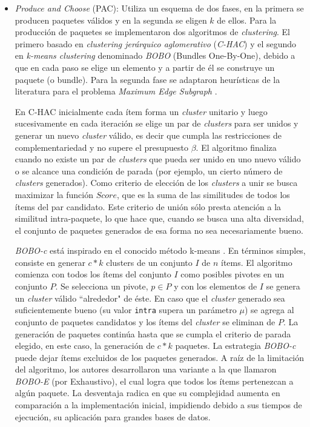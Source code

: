 \begin{itemize}

\item {\em Produce and Choose} (PAC): Utiliza un esquema de dos fases, en la primera se producen paquetes válidos y en la segunda se eligen $k$ de ellos. Para la producción de paquetes se implementaron dos algoritmos de {\em clustering}. El primero basado en {\em clustering jerárquico aglomerativo} (\textit{C-HAC}) y el segundo en {\em k-means clustering} denominado \textit{BOBO} (Bundles One-By-One), debido a que en cada paso se elige un elemento y a partir de él se construye un paquete (o bundle). Para la segunda fase se adaptaron heurísticas de la literatura para el problema {\em Maximum Edge Subgraph} \cite{finding_maximum_density_subgraph}.

En C-HAC inicialmente cada ítem forma un {\em cluster} unitario y luego sucesivamente en cada iteración se elige un par de {\em clusters} para ser unidos y generar un nuevo {\em cluster} válido, es decir que cumpla las restricciones de complementariedad y no supere el presupuesto $\beta$. El algoritmo finaliza cuando no existe un par de {\em clusters} que pueda ser unido en uno nuevo válido o se alcance una condición de parada (por ejemplo, un cierto número de {\em clusters} generados). Como criterio de elección de los {\em clusters} a unir se busca maximizar la función $Score$, que es la suma de las similitudes de todos los ítems del par candidato. Este criterio de unión sólo presta atención a la similitud intra-paquete, lo que hace que, cuando se busca una alta diversidad, el conjunto de paquetes generados de esa forma no sea necesariamente bueno.

{\em BOBO-c} está inspirado en el conocido método k-means \cite{forgy65}. En términos simples, consiste en generar $c*k$ clusters de un conjunto $I$ de $n$ ítems. El algoritmo comienza con todos los ítems del conjunto $I$ como posibles pivotes en un conjunto $P$. Se selecciona un pivote, $p \in P$ y con los elementos de $I$ se genera un {\em cluster} válido ``alrededor" de éste. En caso que el {\em cluster} generado sea suficientemente bueno (su valor \texttt{intra} supera un parámetro $\mu$) se agrega al conjunto de paquetes candidatos y los ítems del {\em cluster} se eliminan de $P$. La generación de paquetes continúa hasta que se cumpla el criterio de parada elegido, en este caso, la generación de $c*k$ paquetes. La estrategia \textit{BOBO-c} puede dejar ítems excluidos de los paquetes generados. A raíz de la limitación del algoritmo, los autores desarrollaron una variante a la que llamaron \textit{BOBO-E} (por Exhaustivo), el cual logra que todos los ítems pertenezcan a algún paquete. La desventaja radica en que su complejidad aumenta en comparación a la implementación inicial, impidiendo debido a sus tiempos de ejecución, su aplicación para grandes bases de datos.


\end{itemize}
